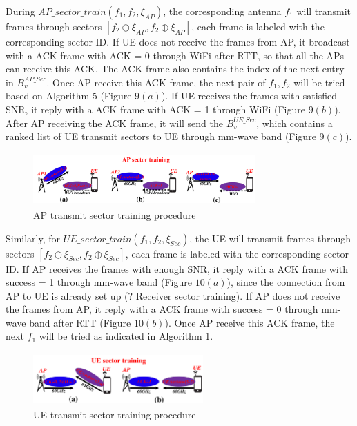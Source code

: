 \documentclass[conference]{IEEEtran}
\begin{document}
During $AP\_sector\_train(f_{1},f_{2},\xi_{AP})$, the corresponding antenna $f_{1}$ will transmit frames through sectors $[f_{2}\ominus \xi_{AP},f_{2}\oplus \xi_{AP}]$, each frame is labeled with the corresponding sector ID. If UE does not receive the frames from AP, it broadcast with a ACK frame with ACK = 0 through WiFi after RTT, so that all the APs can receive this ACK. The ACK frame also contains the index of the next entry in $B_{v}^{AP\_Sec}$. Once AP receive this ACK frame, the next pair of $f_{1},f_{2}$ will be tried based on Algorithm 5 (Figure $9(a)$). If UE receives the frames with satisfied SNR, it reply with a ACK frame with ACK = 1 through WiFi (Figure $9(b)$). After AP receiving the ACK frame, it will send the $B^{UE\_Sec}_{v}$, which contains a ranked list of UE transmit sectors to UE through mm-wave band (Figure $9(c)$). 
\begin{figure}
	\centerline{\includegraphics[width=8.5cm,height=2cm]{ap_sector_training}}
	\caption[U-example]{AP transmit sector training procedure}
\end{figure}
Similarly, for $UE\_sector\_train(f_{1},f_{2},\xi_{Sec})$, the UE will transmit frames through sectors $[f_{2}\ominus \xi_{Sec},f_{2}\oplus \xi_{Sec}]$, each frame is labeled with the corresponding sector ID. If AP receives the frames with enough SNR, it reply with a ACK frame with success = 1 through mm-wave band (Figure $10(a)$), since the connection from AP to UE is already set up (? Receiver sector training). If AP does not receive the frames from AP, it reply with a ACK frame with success = 0 through mm-wave band after RTT (Figure $10(b)$). Once AP receive this ACK frame, the next $f_{1}$ will be tried as indicated in Algorithm 1. 
 \begin{figure}
 	\centerline{\includegraphics[width=6.5cm,height=2cm]{ue_sector_training}}
 	\caption[U-example]{UE transmit sector training procedure}
 \end{figure}
\end{document}
